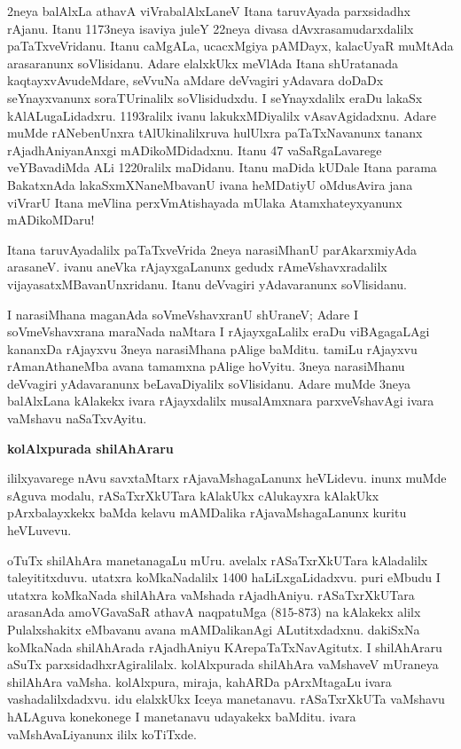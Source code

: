 \documentclass[11pt,a4size]{article}
\begin{document}
2neya balAlxLa athavA viVrabalAlxLaneV Itana taruvAyada parxsidadhx
rAjanu. Itanu 1173neya isaviya juleY 22neya divasa
dAvxrasamudarxdalilx paTaTxveVridanu. Itanu caMgALa, ucacxMgiya
pAMDayx, kalacUyaR muMtAda arasaranunx soVlisidanu. Adare elalxkUkx
meVlAda Itana shUratanada kaqtayxvAvudeMdare, seVvuNa aMdare deVvagiri
yAdavara doDaDx seYnayxvanunx soraTUrinalilx soVlisidudxdu. I
seYnayxdalilx eraDu lakaSx kAlALugaLidadxru. 1193ralilx ivanu
lakukxMDiyalilx vAsavAgidadxnu. Adare muMde rANebenUnxra
tAlUkinalilxruva hulUlxra paTaTxNavanunx tananx rAjadhAniyanAnxgi
mADikoMDidadxnu. Itanu 47 vaSaRgaLavarege veYBavadiMda ALi 1220ralilx
maDidanu. Itanu maDida kUDale Itana parama BakatxnAda
lakaSxmXNaneMbavanU ivana heMDatiyU oMdusAvira jana viVrarU Itana
meVlina perxVmAtishayada mUlaka Atamxhateyxyanunx mADikoMDaru!

Itana taruvAyadalilx paTaTxveVrida 2neya narasiMhanU parAkarxmiyAda
arasaneV. ivanu aneVka rAjayxgaLanunx gedudx rAmeVshavxradalilx
vijayasatxMBavanUnxridanu. Itanu deVvagiri yAdavaranunx soVlisidanu.

I narasiMhana maganAda soVmeVshavxranU shUraneV; Adare I
soVmeVshavxrana maraNada naMtara I rAjayxgaLalilx eraDu viBAgagaLAgi
kananxDa rAjayxvu 3neya narasiMhana pAlige baMditu. tamiLu rAjayxvu
rAmanAthaneMba avana tamamxna pAlige hoVyitu. 3neya narasiMhanu
deVvagiri yAdavaranunx beLavaDiyalilx soVlisidanu. Adare muMde 3neya
balAlxLana kAlakekx ivara rAjayxdalilx musalAmxnara parxveVshavAgi
ivara vaMshavu naSaTxvAyitu.

\bigskip
\centerline{\textbf{\large kolAlxpurada shilAhAraru}}
\medskip




ililxyavarege nAvu savxtaMtarx rAjavaMshagaLanunx heVLidevu. inunx muMde sAguva modalu, rASaTxrXkUTara kAlakUkx cAlukayxra kAlakUkx pArxbalayxkekx baMda kelavu mAMDalika rAjavaMshagaLanunx kuritu heVLuvevu.

oTuTx shilAhAra manetanagaLu mUru. avelalx rASaTxrXkUTara kAladalilx
taleyititxduvu. utatxra koMkaNadalilx 1400 haLiLxgaLidadxvu. puri
eMbudu I utatxra koMkaNada shilAhAra vaMshada
rAjadhAniyu. rASaTxrXkUTara arasanAda amoVGavaSaR athavA naqpatuMga
(815-873) na kAlakekx alilx Pulalxshakitx eMbavanu avana mAMDalikanAgi
ALutitxdadxnu. dakiSxNa koMkaNada shilAhArada rAjadhAniyu
KArepaTaTxNavAgitutx. I shilAhAraru aSuTx
parxsidadhxrAgiralilalx. kolAlxpurada shilAhAra vaMshaveV mUraneya
shilAhAra vaMsha. kolAlxpura, miraja, kahARDa pArxMtagaLu ivara
vashadalilxdadxvu. idu elalxkUkx Iceya manetanavu. rASaTxrXkUTa
vaMshavu hALAguva konekonege I manetanavu udayakekx baMditu. ivara
vaMshAvaLiyanunx ililx koTiTxde.
\end{document}

